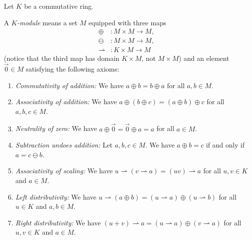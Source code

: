 \begin{definition}
\label{def.alg.module}
\leantarget
\leanok
Let $K$ be a commutative ring.

A $K$\emph{-module} means a set $M$ equipped with three maps
\begin{align*}
\oplus &  :M\times M\rightarrow M,\\
\ominus &  :M\times M\rightarrow M,\\
\rightharpoonup &  :K\times M\rightarrow M
\end{align*}
(notice that the third map has domain $K\times M$, not $M\times M$) and an
element $\overrightarrow{0}\in M$ satisfying the following axioms:

\begin{enumerate}
\item \emph{Commutativity of addition:} We have $a\oplus b=b\oplus a$ for all
$a,b\in M$.

\item \emph{Associativity of addition:} We have $a\oplus\left(  b\oplus
c\right)  =\left(  a\oplus b\right)  \oplus c$ for all $a,b,c\in M$.

\item \emph{Neutrality of zero:} We have $a\oplus\overrightarrow{0}%
=\overrightarrow{0}\oplus a=a$ for all $a\in M$.

\item \emph{Subtraction undoes addition:} Let $a,b,c\in M$. We have $a\oplus
b=c$ if and only if $a=c\ominus b$.

\item \emph{Associativity of scaling:} We have $u\rightharpoonup\left(
v\rightharpoonup a\right)  =\left(  uv\right)  \rightharpoonup a$ for all
$u,v\in K$ and $a\in M$.

\item \emph{Left distributivity:} We have $u\rightharpoonup\left(  a\oplus
b\right)  =\left(  u\rightharpoonup a\right)  \oplus\left(  u\rightharpoonup
b\right)  $ for all $u\in K$ and $a,b\in M$.

\item \emph{Right distributivity:} We have $\left(  u+v\right)
\rightharpoonup a=\left(  u\rightharpoonup a\right)  \oplus\left(
v\rightharpoonup a\right)  $ for all $u,v\in K$ and $a\in M$.


\end{enumerate}
\end{definition}
